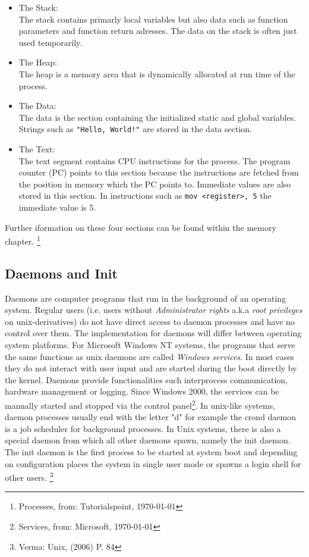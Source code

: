 \begin{itemize}
\item The Stack: \\

The stack contains primarly local variables but also data such as function parameters and function return adresses. The data on the stack is often just used temporarily.
\item The Heap: \\

The heap is a memory area that is dynamically allocated at run time of the process.
\item The Data: \\

	The data is the section containing the initialized static and global variables. Strings such as \texttt{"Hello, World!"} are stored
	in the data section.
\item The Text: \\

	The text segment contains CPU instructions for the process. The program counter (PC) points to this section because the instructions are
		fetched from the position in memory which the PC points to. Immediate values are also stored in this section.
		In instructions such as \texttt{mov \textless register\textgreater, 5} the immediate value is 5.
\end{itemize}

Further iformation on these four sections can be found within the memory chapter. \footnote{Processes, from: Tutorialspoint, \today }


\subsection{Daemons and Init}

Daemons are computer programs that run in the background of an operating system. Regular users (i.e. users without \textit{Administrator rights} a.k.a \textit{root privileges} on unix-derivatives)
do not have direct access to daemon processes and have no control over them. The implementation for daemons will differ between
operating system platforms. For Microsoft Windows NT systems, the programs that serve the same functions as 
unix daemons are called \textit{Windows services}. In most cases they do not interact with user input and are started 
during the boot directly by the kernel.
Daemons provide functionalities such interprocess communication, hardware management or logging. 
Since Windows 2000, the services can be manually started and stopped via the control panel\footnote{Services, from: Microsoft, \today }.
In unix-like systems, daemon processes usually end with the letter "d" for example the crond daemon is 
a job scheduler for background processes. In Unix systems, there is also a special daemon from which all
other daemons spawn, namely the init daemon. The init daemon is the first process to be started at system boot 
and depending on configuration places the system in single user mode or spawns a login shell for other users. \footnote{Verma: Unix, (2006) P. 84 }









